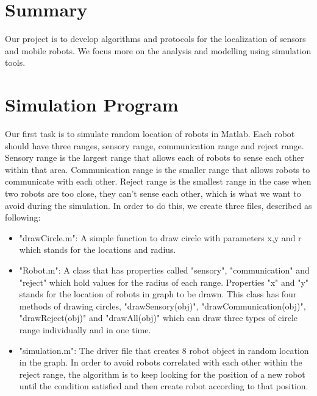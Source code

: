 \documentclass{article}
\begin{document}
\newcommand{\lfront}{\fontsize{17.28pt}{\baselineskip}\selectfont}
\newcommand{\mfront}{\fontsize{12pt}{\baselineskip}\selectfont}
\newcommand{\sfront}{\fontsize{9pt}{\baselineskip}\selectfont}
\fancyhead[L]{\sfront{Jiejie Wei	\&	Bumsik Kim}}
\fancyhead[R]{\sfront{\today}}
\begin{center}
\lfront{\textbf{Robot Simulation}}
\end{center}

\section{Summary}
\qquad Our project is to develop algorithms and protocols for the localization of sensors and mobile robots. We focus more on the analysis and modelling using simulation tools.  \\

	


\section{Simulation Program}
\qquad Our first task is to simulate random location of robots in Matlab. Each robot should have three ranges, sensory range, communication range and reject range. Sensory range is the largest range that allows each of robots to sense each other within that area. Communication range is the smaller range that allows robots to communicate with each other. Reject range is the smallest range in the case when two robots are too close, they can't sense each other, which is what we want to avoid during the simulation. In order to do this, we create three files, described as following:
\begin{itemize}
\item "drawCircle.m": A simple function to draw circle with parameters x,y and r which stands for the locations and radius. \item "Robot.m": A class that has properties called "sensory", "communication" and "reject" which hold values for the radius of each range. Properties "x" and "y" stands for the location of robots in graph to be drawn. This class has four methods of drawing circles, "drawSensory(obj)", "drawCommunication(obj)", "drawReject(obj)" and "drawAll(obj)" which can draw three types of circle range individually and in one time. 
\item "simulation.m": The driver file that creates 8 robot object in random location in the graph. In order to avoid robots correlated with each other within the reject range, the algorithm is to keep looking for the position of a new robot until the condition satisfied and then create robot according to that position. 
\end{itemize}
\end{document}

